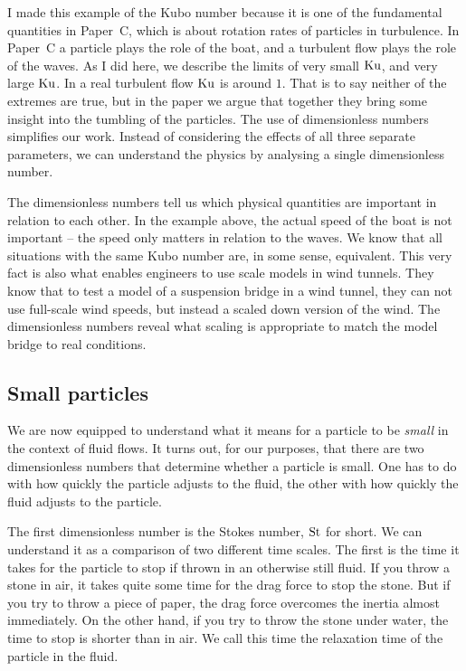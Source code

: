 \documentclass[thesis.tex]{subfiles}
\begin{document}
I made this example of the Kubo number because it is one of the fundamental quantities in Paper~C, which is about rotation rates of particles in turbulence. In Paper~C a particle plays the role of the boat, and a turbulent flow plays the role of the waves. As I did here, we describe the limits of very small $\mbox{Ku}$, and very large $\mbox{Ku}$. In a real turbulent flow $\mbox{Ku}$ is around $1$. That is to say neither of the extremes are true, but in the paper we argue that together they bring some insight into the tumbling of the particles. The use of dimensionless numbers simplifies our work. Instead of considering the effects of all three separate parameters, we can understand the physics by analysing a single dimensionless number.

The dimensionless numbers tell us which physical quantities are important in relation to each other. In the example above, the actual speed of the boat is not important -- the speed only matters in relation to the waves. We know that all situations with the same Kubo number are, in some sense, equivalent. This very fact is also what enables engineers to use scale models in wind tunnels. They know that to test a model of a suspension bridge in a wind tunnel, they can not use full-scale wind speeds, but instead a scaled down version of the wind. The dimensionless numbers reveal what scaling is appropriate to match the model bridge to real conditions.

\subsection*{Small particles}

We are now equipped to understand what it means for a particle to be \emph{small} in the context of fluid flows. It turns out, for our purposes, that there are two dimensionless numbers that determine whether a particle is small. One has to do with how quickly the particle adjusts to the fluid, the other with how quickly the fluid adjusts to the particle.

The first dimensionless number is the Stokes number, $\mbox{St}$ for short. We can understand it as a comparison of two different time scales. The first is the time it takes for the particle to stop if thrown in an otherwise still fluid. If you throw a stone in air, it takes quite some time for the drag force to stop the stone. But if you try to throw a piece of paper, the drag force overcomes the inertia almost immediately. On the other hand, if you try to throw the stone under water, the time to stop is shorter than in air. We call this time the relaxation time of the particle in the fluid. 
\end{document}
